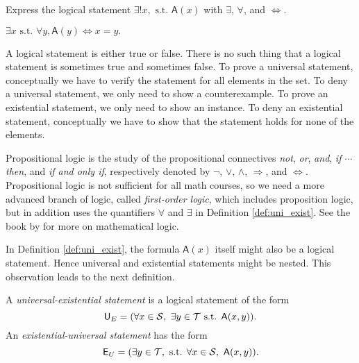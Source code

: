 \begin{exc}
  Express the logical statement $\exists! x, \text{ s.t. } \mathsf{A}(x)$
   with $\exists$, $\forall$, and $\Leftrightarrow$.
\end{exc}
\begin{solution}
  $\exists x \text{ s.t. }\forall y, \mathsf{A}(y) \Leftrightarrow x=y.$
\end{solution}

 \begin{rem}
A logical statement is either true or false.
There is no such thing that
 a logical statement is sometimes true and sometimes false.
To prove a universal statement,
 conceptually we have to verify the statement
 for all elements in the set.
To deny a universal statement,
 we only need to show a counterexample.
To prove an existential statement,
 we only need to show an instance.
To deny an existential statement,
 conceptually we have to show that the statement holds
 for none of the elements.
 \end{rem}

 \begin{rem}
   \label{rem:firstOrderLogicAndPropLogic}
   Propositional logic is the study
   of the propositional connectives
   \emph{not}, \emph{or}, \emph{and},
   \emph{if $\cdots$ then},
   and \emph{if and only if},
   respectively denoted by $\neg$,
   $\vee$, $\wedge$, $\Rightarrow$,
   and $\Leftrightarrow$.
   Propositional logic is not sufficient
   for all math courses,
   so we need a more advanced branch
   of logic, called
   \emph{first-order logic},
   which includes proposition logic,
   but in addition uses the quantifiers
   $\forall$ and $\exists$ in Definition \ref{def:uni_exist}.
   See the book by \cite{hodel13:_introd_mathem_logic}
   for more on mathematical logic.
 \end{rem}
 
 \begin{rem}
   In Definition \ref{def:uni_exist},
    the formula $\mathsf{A}(x)$ itself
    might also be a logical statement.
   Hence universal and existential statements
    might be nested.
   This observation leads to the next definition.
 \end{rem}

 \begin{defn}
   A \emph{universal-existential statement} is a logical statement 
   of the form
   \begin{equation}
     \mathsf{U}_E =
     (\forall x\in {\cal S},\ \exists y\in {\cal T}
     \text{ s.t. } \mathsf{A}(x,y)).
   \end{equation}
   An \emph{existential-universal statement} has the form
   \begin{equation}
     \mathsf{E}_U =
     (\exists y\in {\cal T},\text{ s.t. } \forall x\in {\cal S},\ 
     \mathsf{A}(x,y)).
   \end{equation}
 \end{defn}

